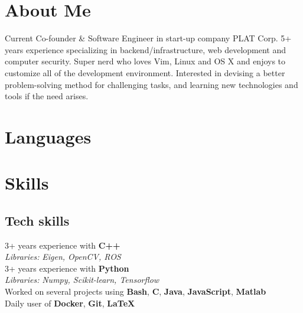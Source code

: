 \documentclass[letterpaper]{soragna-onepage-twocols} %
\begin{document}
\begin{minipage}[t]{0.3\textwidth} %


\section{About Me  \aboutmeicon} 

Current Co-founder \& Software Engineer in start-up company PLAT Corp. 
5+ years experience specializing in backend/infrastructure, web development and computer security. 
Super nerd who loves Vim, Linux and OS X and enjoys to customize all of the development environment. 
Interested in devising a better problem-solving method for challenging tasks, and learning new technologies and tools if the need arises.

\sectionspace %


\section{Languages \languagesicon} 


\sectionspace %


\section{Skills \technicalskillsicon }

\subsection{Tech skills}

3+ years experience with \textbf{C++}\\
{\emph{Libraries:} \small\emph{Eigen, OpenCV, ROS}}\\
3+ years experience with \textbf{Python}\\
{\emph{Libraries:} \small\emph{Numpy, Scikit-learn, Tensorflow}}\\
Worked on several projects using \textbf{Bash}, \textbf{C}, \textbf{Java}, \textbf{JavaScript},  \textbf{Matlab}\\
Daily user of \textbf{Docker}, \textbf{Git}, \textbf{LaTeX}\\


\end{minipage}
\end{document}
